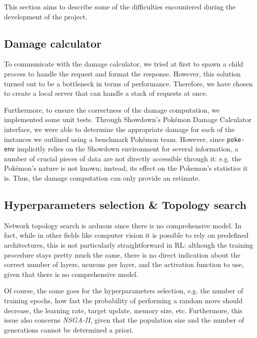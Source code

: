 This section aims to describe some of the difficulties encountered during the development of the project.

\subsection{Damage calculator}
To communicate with the damage calculator, we tried at first to spawn a child process to handle the request and format the response. However, this solution turned out to be a bottleneck in terms of performance. Therefore, we have chosen to create a local server that can handle a stack of requests at once. 

Furthermore, to ensure the correctness of the damage computation, we implemented some unit tests. Through Showdown's Pokémon Damage Calculator interface, we were able to determine the appropriate damage for each of the instances we outlined using a benchmark Pokémon team. However, since \texttt{poke-env} implicitly relies on the Showdown environment for several information, a number of crucial pieces of data are not directly accessible through it: e.g. the Pokémon's nature is not known; instead, its effect on the Pokemon's statistics it is. Thus, the damage computation can only provide an estimate.
 
\subsection{Hyperparameters selection \& Topology search}
Network topology search is arduous since there is no comprehensive model. In fact, while in other fields like computer vision it is possible to rely on predefined architectures, this is not particularly straightforward in RL: although the training procedure stays pretty much the same, there is no direct indication about the correct number of layers, neurons per layer, and the activation function to use, given that there is no comprehensive model.

Of course, the same goes for the hyperparameters selection, e.g. the number of training epochs, how fast the probability of performing a random move should decrease, the learning rate, target update, memory size, etc. Furthermore, this issue also concerns \emph{NSGA-II}, given that the population size and the number of generations cannot be determined a priori.

